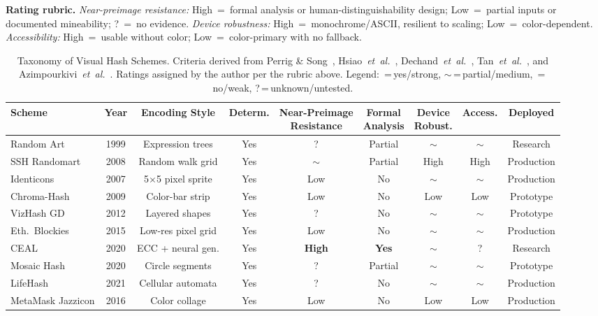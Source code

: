 \documentclass[conference,10pt]{IEEEtran}
\newcommand{\etal}{\textit{et~al.}}
\begin{document}
\smallskip\noindent\textbf{Rating rubric.}
\emph{Near-preimage resistance:} High~=~formal analysis or human-distinguishability design; Low~=~partial inputs or documented mineability; ?~=~no evidence.
\emph{Device robustness:} High~=~monochrome/ASCII, resilient to scaling; Low~=~color-dependent.
\emph{Accessibility:} High~=~usable without color; Low~=~color-primary with no fallback.

\begin{table}[t]
\centering
\caption{Taxonomy of Visual Hash Schemes. Criteria derived from Perrig \& Song~\cite{perrig1999hash}, Hsiao~\etal~\cite{hsiao2009study}, Dechand~\etal~\cite{dechand2016empirical}, Tan~\etal~\cite{tan2017unicorns}, and Azimpourkivi~\etal~\cite{azimpourkivi2020human}. Ratings assigned by the author per the rubric above. Legend: \,=\,yes/strong, $\sim$\,=\,partial/medium, \,=\,no/weak, ?\,=\,unknown/untested.}
\label{tab:taxonomy}
\small
\renewcommand{\arraystretch}{1.15}
\begin{tabular}{@{}l c c c c c c c c@{}}
\toprule
\textbf{Scheme} & \textbf{Year} & \textbf{Encoding Style} & \textbf{Determ.} & \makecell{\textbf{Near-Preimage}\\\textbf{Resistance}} & \makecell{\textbf{Formal}\\\textbf{Analysis}} & \makecell{\textbf{Device}\\\textbf{Robust.}} & \textbf{Access.} & \textbf{Deployed} \\
\midrule
Random Art~\cite{perrig1999hash} & 1999 & Expression trees & Yes & ? & Partial & $\sim$ & $\sim$ & Research \\
SSH Randomart~\cite{openssh2008release,loss2009drunken} & 2008 & Random walk grid & Yes & $\sim$ & Partial & High & High & Production \\
Identicons~\cite{github2013identicons} & 2007 & 5$\times$5 pixel sprite & Yes & Low & No & $\sim$ & $\sim$ & Production \\
Chroma-Hash~\cite{chromahash2009} & 2009 & Color-bar strip & Yes & Low & No & Low & Low & Prototype \\
VizHash GD~\cite{vizhash2012} & 2012 & Layered shapes & Yes & ? & No & $\sim$ & $\sim$ & Prototype \\
Eth.\ Blockies & 2015 & Low-res pixel grid & Yes & Low & No & $\sim$ & $\sim$ & Production \\
CEAL~\cite{azimpourkivi2020human} & 2020 & ECC + neural gen. & Yes & \textbf{High} & \textbf{Yes} & $\sim$ & ? & Research \\
Mosaic Hash~\cite{fietkau2020mosaic} & 2020 & Circle segments & Yes & ? & Partial & $\sim$ & $\sim$ & Prototype \\
LifeHash~\cite{lifehash2021} & 2021 & Cellular automata & Yes & ? & No & $\sim$ & $\sim$ & Production \\
MetaMask Jazzicon & 2016 & Color collage & Yes & Low & No & Low & Low & Production \\
\bottomrule
\end{tabular}
\end{table}
\end{document}
